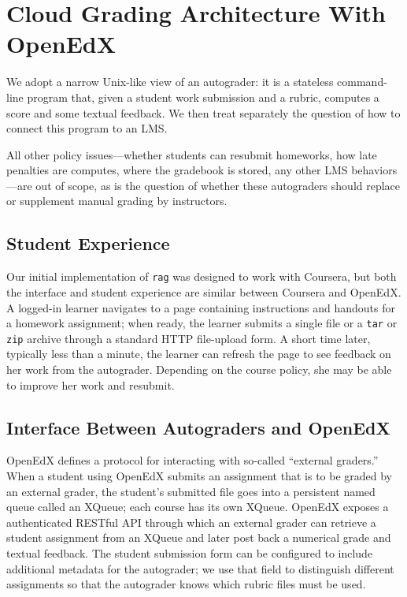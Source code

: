 \section{Cloud Grading Architecture With OpenEdX}
\label{sec:arch}

We adopt a narrow Unix-like view of an autograder: it is a
stateless command-line program that, given a student work submission and
a rubric, computes a score and some textual feedback.  We then treat
separately the question of how to connect this program to an LMS.

All other policy issues---whether students can resubmit homeworks, how
late penalties are computes, where the gradebook is stored, any other
LMS behaviors---are out of scope, as is the question of whether these
autograders should replace or supplement manual grading by instructors.

\subsection{Student Experience}

Our initial implementation of \texttt{rag} was designed to work with
Coursera, but both the interface and student experience are similar
between Coursera and OpenEdX.  A logged-in learner navigates to a page
containing instructions and handouts for a homework assignment;
when ready, the learner submits a single file or a
\texttt{tar} or \texttt{zip} archive through a standard HTTP
file-upload form.  A short time later, typically less than a minute, the
learner can refresh the page to see feedback on her work from the
autograder.  Depending on the course policy, she may be able to improve
her work and resubmit.

\subsection{Interface Between Autograders and OpenEdX}


OpenEdX defines a protocol for interacting with so-called ``external
graders.''  When a student using OpenEdX submits an assignment that is
to be graded by an external grader, the student's submitted file goes
into a persistent named queue called an XQueue; each course has its own
XQueue.  OpenEdX exposes a 
authenticated RESTful API  through which an
external grader can retrieve a student assignment from an XQueue and
later post back a numerical grade and textual feedback.  
The student submission form can be configured to include additional
metadata for the autograder; we use that field to distinguish different
assignments so that the autograder knows which rubric files must be used.

